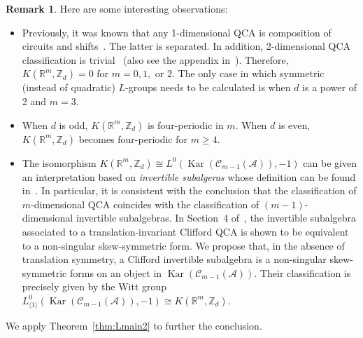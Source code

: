 \documentclass{article}
\theoremstyle{definition}
\newtheorem{rmk}[theorem]{Remark}
\newcommand{\ZZ}{{\mathbb Z}}
\newcommand{\RR}{{\mathbb R}}
\newcommand{\R}{\mathbb R}
\begin{document}
\begin{rmk}
Here are some interesting observations:
\begin{itemize}
    \item Previously, it was known that any 1-dimensional QCA is composition of circuits and shifts~\cite{gross2012index}. The latter is separated. In addition, 2-dimensional QCA classification is trivial~\cite{freedman2020classification} (also see the appendix in~\cite{haah2021clifford}). Therefore, \( K(\mathbb{R}^m, \mathbb{Z}_d) = 0 \) for \( m = 0, 1, \) or \( 2 \). The only case in which symmetric (instead of quadratic) \( L \)-groups needs to be calculated is when \( d \) is a power of 2 and \( m = 3 \).
    \item When $d$ is odd, $K(\RR^m, \ZZ_d)$ is four-periodic in $m$. When $d$ is even, $K(\RR^m, \ZZ_d)$ becomes four-periodic for $m\geq 4.$
    \item
    The isomorphism $K(\mathbb R^m,\mathbb Z_d)\cong L^0(\operatorname{Kar}(\mathcal C_{m-1}(\mathcal A)),-1)$ can be given an interpretation based on \emph{invertible subalgeras} whose definition can be found in~\cite{haah2023invertible}. In particular, it is consistent with the conclusion that the classification of $m$-dimensional QCA coincides with the classification of $(m-1)$-dimensional invertible subalgebras. In Section~4 of~\cite{haah2023invertible}, the invertible subalgebra associated to a translation-invariant Clifford QCA is shown to be equivalent to a non-singular skew-symmetric form. We propose that, in the absence of translation symmetry, a Clifford invertible subalgebra is a non-singular skew-symmetric forms on an object in $\operatorname{Kar}(\mathcal C_{m-1}(\mathcal A))$. Their classification is precisely given by the Witt group $L^0_{\langle1\rangle}(\operatorname{Kar}(\mathcal C_{m-1}(\mathcal A)),-1)\cong K(\R^m, \ZZ_d)$.
\end{itemize}

    
   
    

   \end{rmk}

We apply Theorem~\ref{thm:Lmain2} to further the conclusion.
\end{document}
